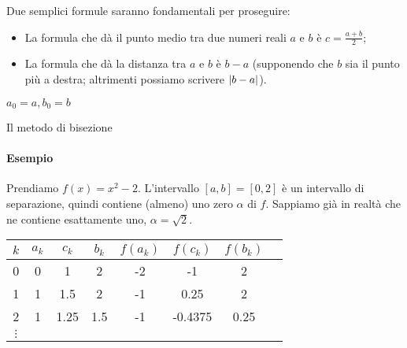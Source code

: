 \documentclass[a4paper]{report}
\DeclarePairedDelimiter{\abs}{\lvert}{\rvert}
\theoremstyle{definiton}
\theoremstyle{remark}
\begin{document}
Due semplici formule saranno fondamentali per proseguire:
\begin{itemize}
    \item La formula che dà il punto medio tra due numeri reali $a$ e $b$ è $c = \frac{a+b}{2}$;
    \item La formula che dà la distanza tra $a$ e $b$ è $b-a$ (supponendo che $b$ sia il punto più a destra; altrimenti possiamo scrivere $\abs{b-a}$).
\end{itemize}
\begin{center}
\end{center}


\begin{algorithm}
$a_0=a,b_0=b$\;
\caption{Il metodo di bisezione}
\end{algorithm}

\paragraph{Esempio} Prendiamo $f(x) = x^2 - 2$. L'intervallo $[a,b] = [0,2]$ è un intervallo di separazione, quindi contiene (almeno) uno zero $\alpha$ di $f$. Sappiamo già in realtà che ne contiene esattamente uno, $\alpha=\sqrt{2}$.

\begin{center}
    \begin{tabular}{cccccccc}
        \toprule
        $k$ & $a_k$ & $c_k$ & $b_k$ & $f(a_k)$ & $f(c_k)$ & $f(b_k)$\\
        \midrule
        0 & 0 & 1 & 2 & -2 & -1 & 2\\
        1 & 1 & 1.5 & 2 & -1 & 0.25 & 2\\
        2 & 1 & 1.25 & 1.5 & -1 & -0.4375 & 0.25\\
        $\vdots$\\
        \bottomrule
    \end{tabular}
\end{center}
\end{document}
